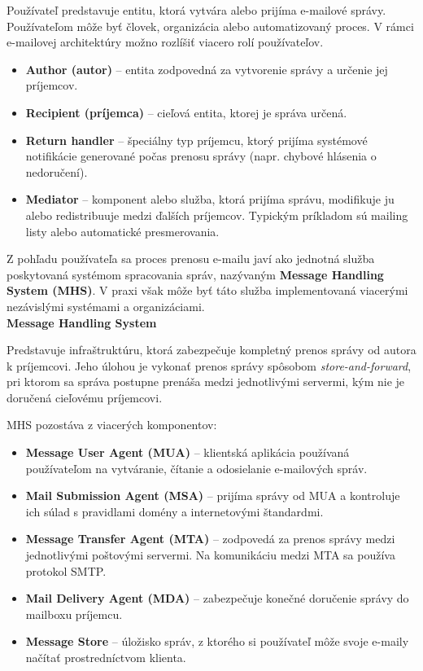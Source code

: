 \documentclass[conference]{IEEEtran}
\begin{document}
Používateľ predstavuje entitu, ktorá vytvára alebo prijíma e-mailové správy. 
Používateľom môže byť človek, organizácia alebo automatizovaný proces. 
V rámci e-mailovej architektúry možno rozlíšiť viacero rolí používateľov\cite{rfc5598}.

\begin{itemize}
\item \textbf{Author (autor)} – entita zodpovedná za vytvorenie správy a určenie jej príjemcov.
\item \textbf{Recipient (príjemca)} – cieľová entita, ktorej je správa určená.
\item \textbf{Return handler} – špeciálny typ príjemcu, ktorý prijíma systémové notifikácie generované počas prenosu správy (napr. chybové hlásenia o nedoručení).
\item \textbf{Mediator} – komponent alebo služba, ktorá prijíma správu, modifikuje ju alebo redistribuuje medzi ďalších príjemcov. Typickým príkladom sú mailing listy alebo automatické presmerovania.
\end{itemize}

Z pohľadu používateľa sa proces prenosu e-mailu javí ako jednotná služba 
poskytovaná systémom spracovania správ, nazývaným \textbf{Message Handling System (MHS)}. 
V praxi však môže byť táto služba implementovaná viacerými nezávislými systémami 
a organizáciami\cite{rfc5598}.\\

\textbf{Message Handling System}

Predstavuje infraštruktúru, ktorá zabezpečuje 
kompletný prenos správy od autora k príjemcovi. 
Jeho úlohou je vykonať prenos správy spôsobom \textit{store-and-forward}, 
pri ktorom sa správa postupne prenáša medzi jednotlivými servermi, 
kým nie je doručená cieľovému príjemcovi\cite{rfc5598}.

MHS pozostáva z viacerých komponentov\cite{rfc5598}:

\begin{itemize}
\item \textbf{Message User Agent (MUA)} – klientská aplikácia používaná používateľom 
na vytváranie, čítanie a odosielanie e-mailových správ.
\item \textbf{Mail Submission Agent (MSA)} – prijíma správy od MUA a kontroluje ich 
súlad s pravidlami domény a internetovými štandardmi.
\item \textbf{Message Transfer Agent (MTA)} – zodpovedá za prenos správy medzi jednotlivými 
poštovými servermi. Na komunikáciu medzi MTA sa používa protokol SMTP.
\item \textbf{Mail Delivery Agent (MDA)} – zabezpečuje konečné doručenie správy 
do mailboxu príjemcu.
\item \textbf{Message Store} – úložisko správ, z ktorého si používateľ môže 
svoje e-maily načítať prostredníctvom klienta.
\end{itemize}
\end{document}

